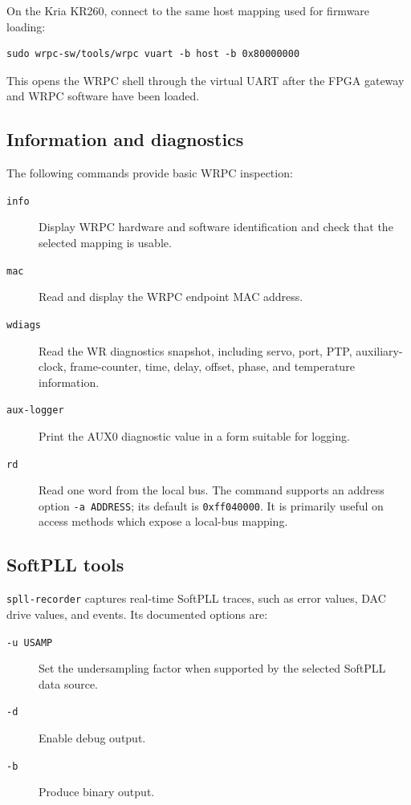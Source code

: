 \documentclass[a4paper,12pt]{article}
\begin{document}
On the Kria KR260, connect to the same host mapping used for firmware loading:

\begin{lstlisting}
sudo wrpc-sw/tools/wrpc vuart -b host -b 0x80000000
\end{lstlisting}

This opens the WRPC shell through the virtual UART after the FPGA gateway and
WRPC software have been loaded.

\subsection{Information and diagnostics}

The following commands provide basic WRPC inspection:

\begin{description}
\item[\texttt{info}] Display WRPC hardware and software identification and
  check that the selected mapping is usable.
\item[\texttt{mac}] Read and display the WRPC endpoint MAC address.
\item[\texttt{wdiags}] Read the WR diagnostics snapshot, including servo,
  port, PTP, auxiliary-clock, frame-counter, time, delay, offset, phase, and
  temperature information.
\item[\texttt{aux-logger}] Print the AUX0 diagnostic value in a form suitable
  for logging.
\item[\texttt{rd}] Read one word from the local bus. The command supports an
  address option \texttt{-a ADDRESS}; its default is \texttt{0xff040000}. It
  is primarily useful on access methods which expose a local-bus mapping.
\end{description}

\subsection{SoftPLL tools}

\texttt{spll-recorder} captures real-time SoftPLL traces, such as error
values, DAC drive values, and events. Its documented options are:

\begin{description}
\item[\texttt{-u USAMP}] Set the undersampling factor when supported by the
  selected SoftPLL data source.
\item[\texttt{-d}] Enable debug output.
\item[\texttt{-b}] Produce binary output.
\end{description}
\end{document}
